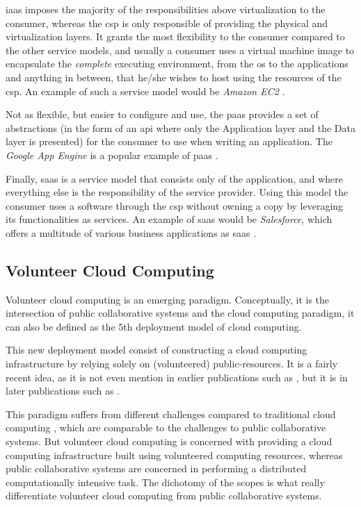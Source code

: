 \documentclass[12pt, titlepage]{uo_temp}
\begin{document}
     \gls{iaas} imposes the majority of the responsibilities above virtualization to the
     consumer, whereas the \gls{csp} is only responsible of providing the physical and
     virtualization layers. It grants the most flexibility to the consumer compared to the
     other service models, and usually a consumer uses a virtual machine image to
     encapsulate the \emph{complete} executing environment, from the \gls{os} to the
     applications and anything in between, that he/she wishes to host using the resources
     of the \gls{csp}. An example of such a service model would be \emph{Amazon EC2} \cite{AWS}.

     Not as flexible, but easier to configure and use, the \gls{paas} provides a set of
     abstractions (in the form of an \gls{api} where only the Application layer and the
     Data layer is presented) for the consumer to use when writing an application. The
     \emph{Google App Engine} is a popular example of \gls{paas} \cite{gae_web}.

     Finally, \gls{saas} is a service model that consists only of the application, and
     where everything else is the responsibility of the service provider. Using this model
     the consumer uses a software through the \gls{csp} without owning a copy by
     leveraging its functionalities as services. An example of \gls{saas} would be
     \emph{Salesforce}, which offers a multitude of various business applications as
     \gls{saas} \cite{salesforce}.
     
     \subsection{Volunteer Cloud Computing} \label{VCC}
     Volunteer cloud computing is an emerging paradigm.
     Conceptually, it is the intersection of public collaborative systems and the cloud
     computing paradigm, it can also be defined as the 5th deployment model of cloud
     computing.

     This new deployment model consist of constructing a cloud computing infrastructure by
     relying solely on (volunteered) public-resources. It is a fairly recent idea, as it is not even
     mention in earlier publications such as \cite{taxonomy}, but it is in later
     publications such as \cite{soa_cloud}.

     This paradigm suffers from different challenges compared to traditional cloud
     computing \cite{anjomshoa2015taxonomy}, which are comparable to the challenges to public
     collaborative systems. But volunteer cloud computing is concerned with providing a
     cloud computing infrastructure built using volunteered computing resources, whereas
     public collaborative systems are concerned in performing a distributed
     computationally intensive task. The dichotomy of the scopes is what really
     differentiate volunteer cloud computing from public collaborative systems.
\end{document}
